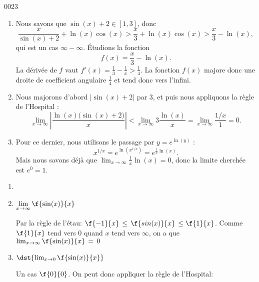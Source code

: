 \begin{corrige}{0023}
\begin{enumerate}
\item
Nous savons que $\sin(x)+2\in[1,3]$, donc
\begin{equation}
	\frac{ x }{ \sin(x)+2 }+\ln(x)\cos(x)>\frac{ x }{ 3 }+\ln(x)\cos(x)>\frac{ x }{ 3 }-\ln(x),
\end{equation}
qui est un cas $\infty-\infty$. Étudions la fonction
\begin{equation}		\label{Eq0023ffrac}
	f(x)=\frac{ x }{ 3 }-\ln(x).
\end{equation}
La dérivée de $f$ vaut $f'(x)=\frac{1}{ 3 }-\frac{1}{ x }>\frac{1}{ 4 }$. La fonction $f(x)$ majore donc une droite de coefficient angulaire $\frac{ 1 }{ 4 }$ et tend donc vers l'infini.

\item
Nous majorons d'abord $|\sin(x)+2|$ par $3$, et puis nous appliquons la règle de l'Hospital :
\begin{equation}
	\lim_{x\to\infty}\left| \frac{ \ln(x)\big( \sin(x)+2 \big) }{ x } \right|<\lim_{x\to\infty}3\frac{ \ln(x) }{ x }=\lim_{x\to\infty}\frac{ 1/x }{ 1 }=0.
\end{equation}

\item
Pour ce dernier, nous utilisons le passage par $y= e^{\ln(y)}$ :
\begin{equation}
	x^{1/x}= e^{\ln(x^{1/x})}= e^{\frac{1}{ x }\ln(x)}.
\end{equation}
Mais nous savons déjà que $\lim_{x\to\infty}\frac{1}{ x }\ln(x)=0$, donc la limite cherchée est $ e^{0}=1$.

\end{enumerate}

\begin{alternative}

	\begin{enumerate}

		\item

		\item $\displaystyle{ \lim_{x\rightarrow \infty}\f{\sin(x)}{x}}$\hs

		Par la règle de l'étau: $ \f{-1}{x} \, \leq\, \f{sin(x)}{x} \,\leq \f{1}{x}$. Comme $\f{1}{x}$ tend vers $0$ quand $x$ tend vers $\infty$, on a que $ \lim_{x\rightarrow\infty}\f{\sin(x)}{x} \, =\,0$

		\item $ \dst{\lim_{x\rightarrow 0}\f{\sin(x)}{x}}$\hs

		Un cas $\f{0}{0}$. On peut donc appliquer la règle de l'Hospital:


\end{enumerate}
\end{alternative}
\end{corrige}
